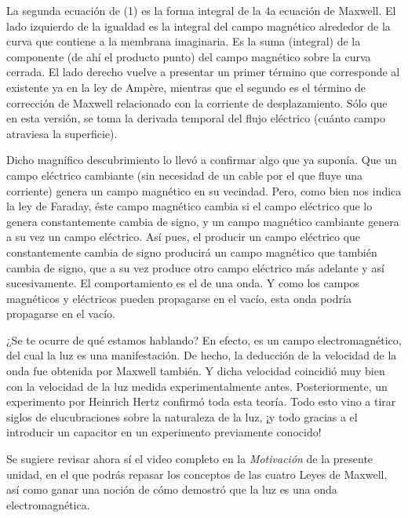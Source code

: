 \documentclass{article}
\begin{document}
La segunda ecuación de (1) es la forma integral de la 4a ecuación de Maxwell. El lado izquierdo de la igualdad es la integral del campo magnético alrededor de la curva que contiene a la membrana imaginaria. Es la suma (integral) de la componente (de ahí el producto punto) del campo magnético sobre la curva cerrada. El lado derecho vuelve a presentar un primer término que corresponde al existente ya en la ley de Ampère, mientras que el segundo es el término de corrección de Maxwell relacionado con la corriente de desplazamiento. Sólo que en esta versión, se toma la derivada temporal del flujo eléctrico (cuánto campo atraviesa la superficie).\bigskip

Dicho magnífico descubrimiento lo llevó a confirmar algo que ya suponía. Que un campo eléctrico cambiante (sin necesidad de un cable por el que fluye una corriente) genera un campo magnético en su vecindad. Pero, como bien nos indica la ley de Faraday, éste campo magnético cambia si el campo eléctrico que lo genera constantemente cambia de signo, y un campo magnético cambiante genera a su vez un campo eléctrico. Así pues, el producir un campo eléctrico que constantemente cambia de signo producirá un campo magnético que también cambia de signo, que a su vez produce otro campo eléctrico más adelante y así sucesivamente. El comportamiento es el de una onda. Y como los campos magnéticos y eléctricos pueden propagarse en el vacío, esta onda podría propagarse en el vacío.\bigskip

¿Se te ocurre de qué estamos hablando? En efecto, es un campo electromagnético, del cual la luz es una manifestación. De hecho, la deducción de la velocidad de la onda fue obtenida por Maxwell también. Y dicha velocidad coincidió muy bien con la velocidad de la luz medida experimentalmente antes. Posteriormente, un experimento por Heinrich Hertz confirmó toda esta teoría. Todo esto vino a tirar siglos de elucubraciones sobre la naturaleza de la luz, ¡y todo gracias a el introducir un capacitor en un experimento previamente conocido!\bigskip

Se sugiere revisar ahora sí el video completo en la \emph{Motivación} de la presente unidad, en el que podrás repasar los conceptos de las cuatro Leyes de Maxwell, así como ganar una noción de cómo demostró que la luz es una onda electromagnética.
\end{document}
